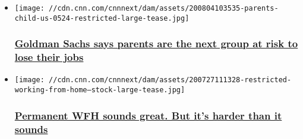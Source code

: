 \begin{itemize}
\item
  \href{/2020/08/04/economy/schools-reopening-economy-jobs/index.html}{}

  \texttt{[image: //cdn.cnn.com/cnnnext/dam/assets/200804103535-parents-child-us-0524-restricted-large-tease.jpg]}

  \hypertarget{goldman-sachs-says-parents-are-the-next-group-at-risk-to-lose-their-jobs}{%
  \subsubsection{\texorpdfstring{\href{/2020/08/04/economy/schools-reopening-economy-jobs/index.html}{Goldman
  Sachs says parents are the next group at risk to lose their
  jobs}}{Goldman Sachs says parents are the next group at risk to lose their jobs}}\label{goldman-sachs-says-parents-are-the-next-group-at-risk-to-lose-their-jobs}}
\item
  \href{/2020/07/29/success/work-from-home-sustainable/index.html}{}

  \texttt{[image: //cdn.cnn.com/cnnnext/dam/assets/200727111328-restricted-working-from-home---stock-large-tease.jpg]}

  \hypertarget{permanent-wfh-sounds-great-but-its-harder-than-it-sounds}{%
  \subsubsection{\texorpdfstring{\href{/2020/07/29/success/work-from-home-sustainable/index.html}{Permanent
  WFH sounds great. But it's harder than it
  sounds}}{Permanent WFH sounds great. But it's harder than it sounds}}\label{permanent-wfh-sounds-great-but-its-harder-than-it-sounds}}
\end{itemize}

